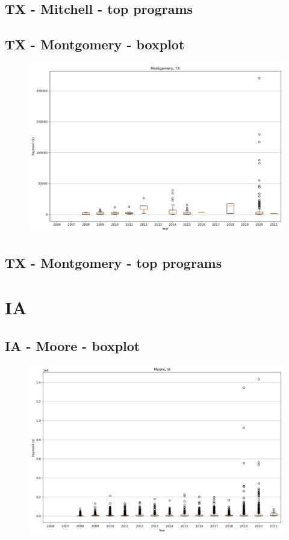 \subsection*{TX - Mitchell - top programs}

\newpage
\subsection*{TX - Montgomery - boxplot}
\begin{figure}[h]
\centering
\includegraphics[width=7in]{../output/boxplots/counties/Montgomery-TX_boxplot.png}
\end{figure}


\subsection*{TX - Montgomery - top programs}

\newpage
\section*{IA}
\subsection*{IA - Moore - boxplot}
\begin{figure}[h]
\centering
\includegraphics[width=7in]{../output/boxplots/counties/Moore-IA_boxplot.png}
\end{figure}



